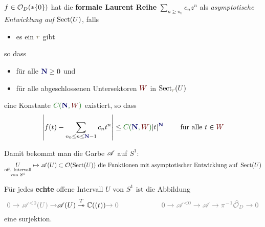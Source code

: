 \begin{defn}
  \def\myN{\textbf{\textcolor{blue!40!black}{N}}}
  \def\mySect{\textcolor{red!40!black}{W}}
  \def\myConst{\textcolor{green!40!black}{C(\myN,\mySect)}}
  $f\in\mathcal{O}_D(*\{0\})$ hat die \textbf{formale Laurent Reihe}
  $\sum_{n\geq n_0}c_nz^n$ als \emph{asymptotische Entwicklung auf
  $\operatorname{Sect}(U)$}, falls
  \begin{itemize}
    \item es ein $\textcolor{yellow!30!black}{r}$ gibt 
  \end{itemize}
  so dass
  \begin{itemize}
    \item für alle $\myN\geq0$ und
    \item für alle abgeschlossenen Untersektoren $\mySect$ in
      $\Sect_{\textcolor{yellow!30!black}{r}}(U)$
  \end{itemize}
  eine Konstante $\myConst$ existiert, so dass
  \[
    \left|
      f(t)-\sum_{n_0\leq n\leq\myN-1}c_nt^n
    \right|
    \leq \myConst|t|^{\myN} \qquad \text{ für alle } t\in \mySect
  \]

  \begin{comment}
    oder äquivalent:
    $\lim_{z\to0,z\in{\mySect}}|t|^{-(\myN-1)}
      \left|
        f(t)-\sum_{n_0\leq n\leq \myN-1}c_nt^n
      \right|=0$
  \end{comment}
  Damit bekommt man die Garbe $\mathscr{A}$ auf $S^1$:
  \[
    \underset{\text{von } S^1}{\underset{\text{off. Intervall}}{U}}
    \mapsto\mathscr{A}(U)
    \subset\mathcal{O}(\operatorname{Sect}(U)) \text{ die Funktionen mit asymptotischer
    Entwicklung auf } \operatorname{Sect}(U)
  \]
  \TODO[Garbe auf $\tilde D=S^1\times[0,r)$ anstatt auf $S^1$]
\end{defn}
\begin{lem}
  Für jedes \textbf{echte} offene Intervall $U$ von $S^1$ ist die Abbildung
  \[
    \textcolor{gray}{0\to \sA^{<0}(U) \to}
    \sA(U) \overset{T}\twoheadrightarrow \C((t))
    \textcolor{gray}{\to0}
    \qquad
    \qquad
    \qquad
    \textcolor{gray}{0\to \sA^{<0} \to
    \sA \to \pi^{-1}\hat\cO_{D}
    \to0}
  \]
  eine surjektion.
\end{lem}
